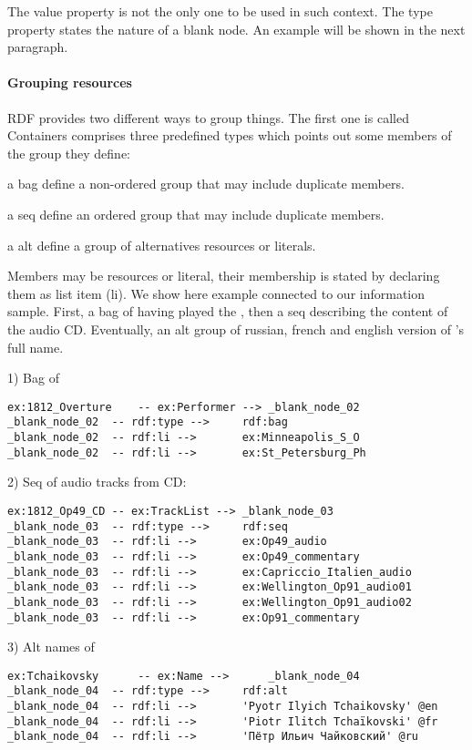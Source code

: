 The value property is not the only one to be used in such context. 
The type property states the nature of a blank node. 
An example will be shown in the next paragraph.

\paragraph{Grouping resources}
RDF provides two different ways to group things. The first one is called Containers comprises three predefined types which points out some members of the group they define:
\begin{liste}
	\item a bag define a non-ordered group that may include duplicate members. 
	\item a seq define an ordered group that may include duplicate members.
	\item a alt define a group of alternatives resources or literals. 
\end{liste}

Members may be resources or literal, their membership is stated by declaring them as list item (li).
We show here example connected to our information sample. First, a bag of  having played the , then a seq describing the content of the audio CD. 
Eventually, an alt group of russian, french and english version of 's full name.

1) Bag of 
\begin{Verbatim}[fontsize=\small,formatcom=\color{black!70}]
ex:1812_Overture	-- ex:Performer -->	_blank_node_02
_blank_node_02	-- rdf:type -->		rdf:bag
_blank_node_02	-- rdf:li -->		ex:Minneapolis_S_O
_blank_node_02	-- rdf:li -->		ex:St_Petersburg_Ph
\end{Verbatim}
2) Seq of audio tracks from  CD:
\begin{Verbatim}[fontsize=\small,formatcom=\color{black!70}]
ex:1812_Op49_CD	-- ex:TrackList -->	_blank_node_03
_blank_node_03	-- rdf:type -->		rdf:seq
_blank_node_03	-- rdf:li -->		ex:Op49_audio
_blank_node_03	-- rdf:li -->		ex:Op49_commentary
_blank_node_03	-- rdf:li -->		ex:Capriccio_Italien_audio
_blank_node_03	-- rdf:li -->		ex:Wellington_Op91_audio01
_blank_node_03	-- rdf:li -->		ex:Wellington_Op91_audio02
_blank_node_03	-- rdf:li -->		ex:Op91_commentary
\end{Verbatim}
3) Alt names of 
\begin{Verbatim}[fontsize=\small,formatcom=\color{black!70}]
ex:Tchaikovsky		-- ex:Name -->		_blank_node_04
_blank_node_04	-- rdf:type -->		rdf:alt
_blank_node_04	-- rdf:li -->		'Pyotr Ilyich Tchaikovsky' @en
_blank_node_04	-- rdf:li -->		'Piotr Ilitch Tchaïkovski' @fr
_blank_node_04	-- rdf:li -->		'Пётр Ильич Чайкoвский' @ru
\end{Verbatim}

